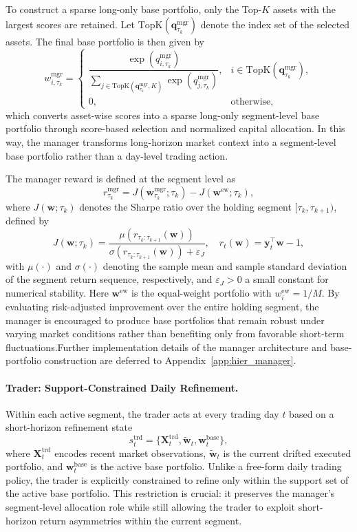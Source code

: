 \documentclass[letterpaper]{article} %
\begin{document}
To construct a sparse long-only base portfolio, only the Top-\(K\) assets with the largest scores are retained. Let \(\mathrm{TopK}(\mathbf{q}^{\mathrm{mgr}}_{\tau_k})\) denote the index set of the selected assets. The final base portfolio is then given by
\[
w_{i,\tau_k}^{\mathrm{mgr}}
=
\begin{cases}
\dfrac{\exp(q_{i,\tau_k}^{\mathrm{mgr}})}
{\sum_{j\in\mathrm{TopK}(\mathbf{q}^{\mathrm{mgr}}_{\tau_k},K)}
\exp(q_{j,\tau_k}^{\mathrm{mgr}})},
& i\in\mathrm{TopK}(\mathbf{q}^{\mathrm{mgr}}_{\tau_k}),\\[10pt]
0, & \text{otherwise},
\end{cases}
\]
which converts asset-wise scores into a sparse long-only segment-level base portfolio through score-based selection and normalized capital allocation. In this way, the manager transforms long-horizon market context into a segment-level base portfolio rather than a day-level trading action.

The manager reward is defined at the segment level as
\[
r^{\mathrm{mgr}}_{\tau_k}
=
J\!\left(\mathbf{w}^{\mathrm{mgr}}_{\tau_k};\tau_k\right)
-
J\!\left(\mathbf{w}^{\mathrm{ew}};\tau_k\right),
\]
where \(J(\mathbf{w};\tau_k)\) denotes the Sharpe ratio over the holding segment \([\tau_k,\tau_{k+1})\), defined by
\[
J(\mathbf{w};\tau_k)
=
\frac{
\mu\!\left(r_{\tau_k:\tau_{k+1}}(\mathbf{w})\right)
}{
\sigma\!\left(r_{\tau_k:\tau_{k+1}}(\mathbf{w})\right)+\varepsilon_J
},
\quad
r_t(\mathbf{w})=\mathbf{y}_t^\top\mathbf{w}-1,
\]
with \(\mu(\cdot)\) and \(\sigma(\cdot)\) denoting the sample mean and sample standard deviation of the segment return sequence, respectively, and \(\varepsilon_J>0\) a small constant for numerical stability. Here \(\mathbf{w}^{\mathrm{ew}}\) is the equal-weight portfolio with \(w_i^{\mathrm{ew}}=1/M\). By evaluating risk-adjusted improvement over the entire holding segment, the manager is encouraged to produce base portfolios that remain robust under varying market conditions rather than benefiting only from favorable short-term fluctuations.Further implementation details of the manager architecture and base-portfolio construction are deferred to Appendix~\ref{app:hier_manager}.

\paragraph{Trader: Support-Constrained Daily Refinement.}
Within each active segment, the trader acts at every trading day \(t\) based on a short-horizon refinement state
\[
s_t^{\mathrm{trd}}
=
\bigl\{\mathbf{X}^{\mathrm{trd}}_t,\tilde{\mathbf{w}}_t,\mathbf{w}^{\mathrm{base}}_t\bigr\},
\]
where \(\mathbf{X}^{\mathrm{trd}}_t\) encodes recent market observations, \(\tilde{\mathbf{w}}_t\) is the current drifted executed portfolio, and \(\mathbf{w}^{\mathrm{base}}_t\) is the active base portfolio. Unlike a free-form daily trading policy, the trader is explicitly constrained to refine only within the support set of the active base portfolio. This restriction is crucial: it preserves the manager’s segment-level allocation role while still allowing the trader to exploit short-horizon return asymmetries within the current segment.
\end{document}
